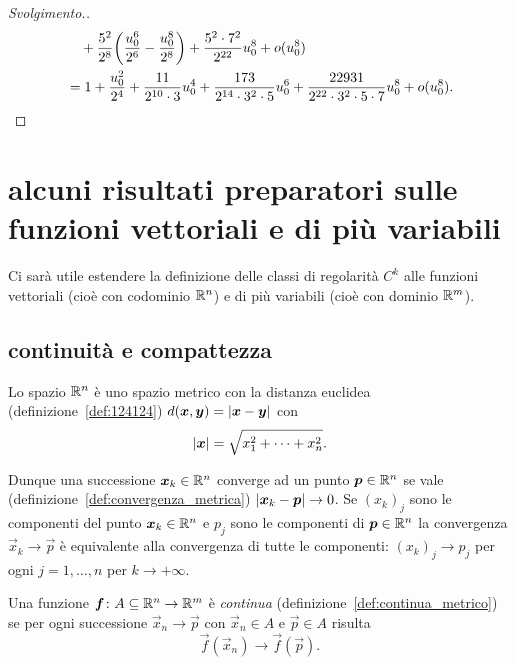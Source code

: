 \begin{proof}[Svolgimento.]
\begin{align*}
&\quad + \frac{5^2}{2^8}\enclose{\frac{u_0^6}{2^6} - \frac{u_0^8}{2^8}}
+ \frac{5^2\cdot 7^2}{2^{22}}
u_0^8 + o(u_0^8)\\
%
&= 1 + \frac{u_0^2}{2^4} + \frac{11}{2^{10}\cdot 3} u_0^4
 + \frac{173}{2^{14}\cdot 3^2\cdot 5} u_0^6
 + \frac{22931}{2^{22}\cdot 3^2\cdot 5\cdot 7} u_0^8
 + o(u_0^8).\\
\end{align*}
\end{proof}

\section[funzioni vettoriali e di più variabili]{alcuni risultati preparatori
sulle funzioni vettoriali e di più variabili}

Ci sarà utile estendere la definizione delle classi di regolarità $C^k$ alle
funzioni vettoriali (cioè con codominio ${\mathbb R}^n$) e di più variabili
(cioè con dominio ${\mathbb R}^m$).

\subsection{continuità e compattezza}

Lo spazio ${\mathbb R}^n$ è uno spazio metrico con la distanza euclidea 
(definizione~\ref{def:124124})
$d(\boldsymbol x, \boldsymbol y) = {\left|\boldsymbol x- \boldsymbol y\right|}$ con 
\[
 {\left|\boldsymbol x\right|} = \sqrt{x_1^2 + \dots + x_n^2}.  
\] 

Dunque una successione $\boldsymbol x_k\in {\mathbb R}^n$ converge 
ad un punto $\boldsymbol p\in {\mathbb R}^n$ se vale 
(definizione~\ref{def:convergenza_metrica}) 
${\left|\boldsymbol x_k - \boldsymbol p\right|}\to 0$.
Se $(x_k)_j$ sono le componenti del punto $\boldsymbol x_k\in {\mathbb R}^n$ e 
$p_j$ sono le componenti di $\boldsymbol p\in {\mathbb R}^n$ la convergenza 
$\vec x_k \to \vec p$ è equivalente alla convergenza di 
tutte le componenti: $(x_k)_j \to p_j$ per ogni $j=1,\dots,n$
per $k\to +\infty$.

Una funzione $\boldsymbol f\colon A \subseteq {\mathbb R}^n\to {\mathbb R}^m$ 
è \emph{continua} 
(definizione~\ref{def:continua_metrico})
se per ogni successione $\vec x_n \to \vec p$ con 
$\vec x_n\in A$ e $\vec p\in A$ risulta 
\[
  \vec f(\vec x_n) \to \vec f(\vec p).
\]

